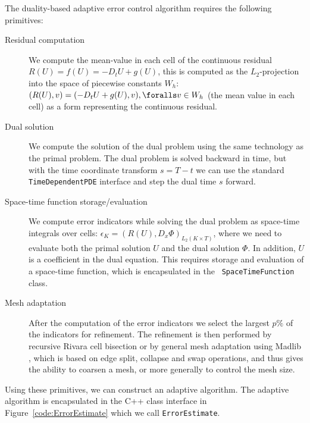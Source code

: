 The duality-based adaptive error control algorithm requires the
following primitives:

\begin{description}
\item[Residual computation]
We compute the mean-value in each cell of the continuous residual
$R(U) = f(U) = -D_t U + g(U)$, this is computed as the
$L_2$-projection into the space of piecewise constants $W_h$: $(R(U),
v) = (-D_t U + g(U), v), \foralls v \in W_h$ (the mean value in each
cell) as a form representing the continuous residual.
\item[Dual solution]
We compute the solution of the dual problem using the same technology
as the primal problem. The dual problem is solved backward in time,
but with the time coordinate transform $s = T - t$ we can use the
standard {\tt TimeDependentPDE} interface and step the dual time $s$
forward.
\item[Space-time function storage/evaluation]
We compute error indicators while solving the dual problem as
space-time integrals over cells: $\epsilon_K = (R(U),
D_x \Phi)_{L_2(K \times T)}$, where we need to evaluate both the
primal solution $U$ and the dual solution $\Phi$. In addition, $U$ is
a coefficient in the dual equation. This requires storage and
evaluation of a space-time function, which is encapsulated in the {\tt
SpaceTimeFunction} class.
\item[Mesh adaptation]
After the computation of the error indicators we select the largest
$p\%$ of the indicators for refinement. The refinement is then
performed by recursive Rivara cell bisection or by general mesh
adaptation using Madlib \citep{Comp`ereRemacleJanssonEtAl2009}, which is
based on edge split, collapse and swap operations, and thus gives
the ability to coarsen a mesh, or more generally to control the mesh
size.
\end{description}

Using these primitives, we can construct an adaptive algorithm. The
adaptive algorithm is encapsulated in the C++ class interface in
Figure~\ref{code:ErrorEstimate} which we call {\tt ErrorEstimate}.

